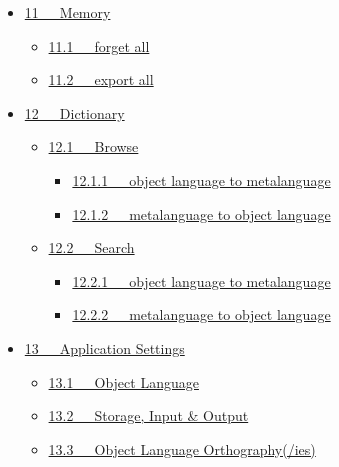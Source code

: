 \documentclass[letterpaper,10pt,english]{sphinxmanual}
\begin{document}
{\begin{minipage}{0.95\linewidth}
\begin{itemize}
\item {} 
{\hyperref[user_guide:memory]{11   Memory}}
\begin{itemize}
\item {} 
{\hyperref[user_guide:forget-all]{11.1   forget all}}

\item {} 
{\hyperref[user_guide:id22]{11.2   export all}}

\end{itemize}

\item {} 
{\hyperref[user_guide:dictionary]{12   Dictionary}}
\begin{itemize}
\item {} 
{\hyperref[user_guide:browse]{12.1   Browse}}
\begin{itemize}
\item {} 
{\hyperref[user_guide:object-language-to-metalanguage]{12.1.1   object language to metalanguage}}

\item {} 
{\hyperref[user_guide:metalanguage-to-object-language]{12.1.2   metalanguage to object language}}

\end{itemize}

\item {} 
{\hyperref[user_guide:search]{12.2   Search}}
\begin{itemize}
\item {} 
{\hyperref[user_guide:id23]{12.2.1   object language to metalanguage}}

\item {} 
{\hyperref[user_guide:id24]{12.2.2   metalanguage to object language}}

\end{itemize}

\end{itemize}

\item {} 
{\hyperref[user_guide:application-settings]{13   Application Settings}}
\begin{itemize}
\item {} 
{\hyperref[user_guide:object-language]{13.1   Object Language}}

\item {} 
{\hyperref[user_guide:storage-input-output]{13.2   Storage, Input \& Output}}

\item {} 
{\hyperref[user_guide:object-language-orthography-ies]{13.3   Object Language Orthography(/ies)}}


\end{itemize}
\end{itemize}
\end{minipage}}
\end{document}
